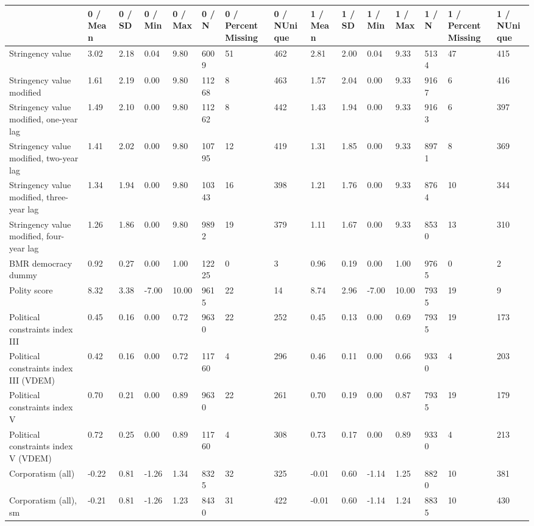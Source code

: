 
\begin{longtable}{lllllllllllllll}
\toprule
  & 0 / Mean & 0 / SD & 0 / Min & 0 / Max & 0 / N & 0 / PercentMissing & 0 / NUnique & 1 / Mean & 1 / SD & 1 / Min & 1 / Max & 1 / N & 1 / PercentMissing & 1 / NUnique\\
\midrule
Stringency value & 3.02 & 2.18 & 0.04 & 9.80 & 6009 & 51 & 462 & 2.81 & 2.00 & 0.04 & 9.33 & 5134 & 47 & 415\\
Stringency value modified & 1.61 & 2.19 & 0.00 & 9.80 & 11268 & 8 & 463 & 1.57 & 2.04 & 0.00 & 9.33 & 9167 & 6 & 416\\
Stringency value modified, one-year lag & 1.49 & 2.10 & 0.00 & 9.80 & 11262 & 8 & 442 & 1.43 & 1.94 & 0.00 & 9.33 & 9163 & 6 & 397\\
Stringency value modified, two-year lag & 1.41 & 2.02 & 0.00 & 9.80 & 10795 & 12 & 419 & 1.31 & 1.85 & 0.00 & 9.33 & 8971 & 8 & 369\\
Stringency value modified, three-year lag & 1.34 & 1.94 & 0.00 & 9.80 & 10343 & 16 & 398 & 1.21 & 1.76 & 0.00 & 9.33 & 8764 & 10 & 344\\
\addlinespace
Stringency value modified, four-year lag & 1.26 & 1.86 & 0.00 & 9.80 & 9892 & 19 & 379 & 1.11 & 1.67 & 0.00 & 9.33 & 8530 & 13 & 310\\
BMR democracy dummy & 0.92 & 0.27 & 0.00 & 1.00 & 12225 & 0 & 3 & 0.96 & 0.19 & 0.00 & 1.00 & 9765 & 0 & 2\\
Polity score & 8.32 & 3.38 & -7.00 & 10.00 & 9615 & 22 & 14 & 8.74 & 2.96 & -7.00 & 10.00 & 7935 & 19 & 9\\
Political constraints index III & 0.45 & 0.16 & 0.00 & 0.72 & 9630 & 22 & 252 & 0.45 & 0.13 & 0.00 & 0.69 & 7935 & 19 & 173\\
Political constraints index III (VDEM) & 0.42 & 0.16 & 0.00 & 0.72 & 11760 & 4 & 296 & 0.46 & 0.11 & 0.00 & 0.66 & 9330 & 4 & 203\\
\addlinespace
Political constraints index V & 0.70 & 0.21 & 0.00 & 0.89 & 9630 & 22 & 261 & 0.70 & 0.19 & 0.00 & 0.87 & 7935 & 19 & 179\\
Political constraints index V (VDEM) & 0.72 & 0.25 & 0.00 & 0.89 & 11760 & 4 & 308 & 0.73 & 0.17 & 0.00 & 0.89 & 9330 & 4 & 213\\
Corporatism (all) & -0.22 & 0.81 & -1.26 & 1.34 & 8325 & 32 & 325 & -0.01 & 0.60 & -1.14 & 1.25 & 8820 & 10 & 381\\
Corporatism (all), sm & -0.21 & 0.81 & -1.26 & 1.23 & 8430 & 31 & 422 & -0.01 & 0.60 & -1.14 & 1.24 & 8835 & 10 & 430\\

\end{longtable}
